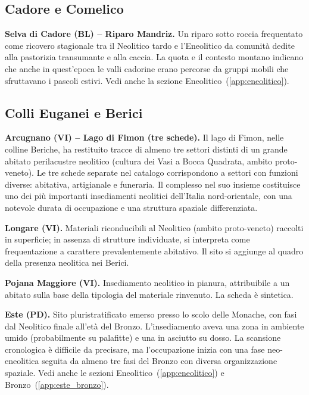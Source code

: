 \subsection{Cadore e Comelico}

\textbf{Selva di Cadore (BL) -- Riparo Mandriz.} \label{app:mandriz} Un riparo sotto roccia frequentato come ricovero stagionale tra il Neolitico tardo e l'Eneolitico da comunità dedite alla pastorizia transumante e alla caccia. La quota e il contesto montano indicano che anche in quest'epoca le valli cadorine erano percorse da gruppi mobili che sfruttavano i pascoli estivi. Vedi anche la sezione Eneolitico~(\ref{app:eneolitico}).

\subsection{Colli Euganei e Berici}

\textbf{Arcugnano (VI) -- Lago di Fimon (tre schede).} \label{app:fimon} Il lago di Fimon, nelle colline Beriche, ha restituito tracce di almeno tre settori distinti di un grande abitato perilacustre neolitico (cultura dei Vasi a Bocca Quadrata, ambito proto-veneto). Le tre schede separate nel catalogo corrispondono a settori con funzioni diverse: abitativa, artigianale e funeraria. Il complesso nel suo insieme costituisce uno dei più importanti insediamenti neolitici dell'Italia nord-orientale, con una notevole durata di occupazione e una struttura spaziale differenziata.

\textbf{Longare (VI).} Materiali riconducibili al Neolitico (ambito proto-veneto) raccolti in superficie; in assenza di strutture individuate, si interpreta come frequentazione a carattere prevalentemente abitativo. Il sito si aggiunge al quadro della presenza neolitica nei Berici.

\textbf{Pojana Maggiore (VI).} Insediamento neolitico in pianura, attribuibile a un abitato sulla base della tipologia del materiale rinvenuto. La scheda è sintetica.

\textbf{Este (PD).} \label{app:este} Sito pluristratificato emerso presso lo scolo delle Monache, con fasi dal Neolitico finale all'età del Bronzo. L'insediamento aveva una zona in ambiente umido (probabilmente su palafitte) e una in asciutto su dosso. La scansione cronologica è difficile da precisare, ma l'occupazione inizia con una fase neo-eneolitica seguita da almeno tre fasi del Bronzo con diversa organizzazione spaziale. Vedi anche le sezioni Eneolitico~(\ref{app:eneolitico}) e Bronzo~(\ref{app:este_bronzo}).

